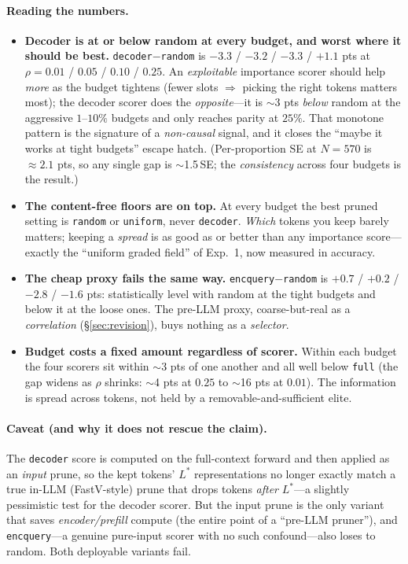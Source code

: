\documentclass[11pt]{article}
\begin{document}
\paragraph{Reading the numbers.}
\begin{itemize}
\item \textbf{Decoder is at or below random at every budget, and worst where it should be
      best.} \texttt{decoder}$-$\texttt{random} is $-3.3$ / $-3.2$ / $-3.3$ / $+1.1$ pts at
      $\rho=0.01$ / $0.05$ / $0.10$ / $0.25$. An \emph{exploitable} importance scorer should
      help \emph{more} as the budget tightens (fewer slots $\Rightarrow$ picking the right
      tokens matters most); the decoder scorer does the \emph{opposite}---it is $\sim$3 pts
      \emph{below} random at the aggressive $1$--$10\%$ budgets and only reaches parity at
      $25\%$. That monotone pattern is the signature of a \emph{non-causal} signal, and it
      closes the ``maybe it works at tight budgets'' escape hatch. (Per-proportion SE at
      $N{=}570$ is $\approx2.1$ pts, so any single gap is $\sim$1.5\,SE; the \emph{consistency}
      across four budgets is the result.)
\item \textbf{The content-free floors are on top.} At every budget the best pruned setting
      is \texttt{random} or \texttt{uniform}, never \texttt{decoder}. \emph{Which} tokens you
      keep barely matters; keeping a \emph{spread} is as good as or better than any importance
      score---exactly the ``uniform graded field'' of Exp.~1, now measured in accuracy.
\item \textbf{The cheap proxy fails the same way.} \texttt{encquery}$-$\texttt{random} is
      $+0.7$ / $+0.2$ / $-2.8$ / $-1.6$ pts: statistically level with random at the tight
      budgets and below it at the loose ones. The pre-LLM proxy, coarse-but-real as a
      \emph{correlation} (\S\ref{sec:revision}), buys nothing as a \emph{selector}.
\item \textbf{Budget costs a fixed amount regardless of scorer.} Within each budget the four
      scorers sit within $\sim$3 pts of one another and all well below \texttt{full}
      (the gap widens as $\rho$ shrinks: $\sim$4 pts at $0.25$ to $\sim$16 pts at $0.01$).
      The information is spread across tokens, not held by a removable-and-sufficient elite.
\end{itemize}

\paragraph{Caveat (and why it does not rescue the claim).} The \texttt{decoder} score is
computed on the full-context forward and then applied as an \emph{input} prune, so the kept
tokens' $L^{\!*}$ representations no longer exactly match a true in-LLM (FastV-style) prune
that drops tokens \emph{after} $L^{\!*}$---a slightly pessimistic test for the decoder
scorer. But the input prune is the only variant that saves \emph{encoder/prefill} compute
(the entire point of a ``pre-LLM pruner''), and \texttt{encquery}---a genuine pure-input
scorer with no such confound---also loses to random. Both deployable variants fail.
\end{document}
